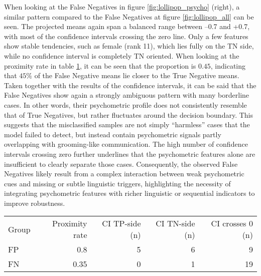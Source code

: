 When looking at the False Negatives in figure \ref{fig:lollipop_psycho} (right), a similar pattern compared to the False Negatives at figure \ref{fig:lollipop_all} can be seen. The projected means again span a balanced range between –0.7 and +0.7, with most of the confidence intervals crossing the zero line. Only a few features show stable tendencies, such as female  (rank 11), which lies fully on the TN side, while no confidence interval is completely TN oriented. When looking at the proximity rate in table \ref{tab:proximity_key_results_psycho}, it can be seen that the proportion is $0.45$, indicating that $45\%$ of the False Negative means lie closer to the True Negative means. Taken together with the results of the confidence intervals, it can be said that the False Negatives show again a strongly ambiguous pattern with many borderline cases.  In other words, their psychometric profile does not consistently resemble that of True Negatives, but rather fluctuates around the decision boundary. This suggests that the misclassified samples are not simply ``harmless'' cases that the model failed to detect, but instead contain psychometric signals partly overlapping with grooming-like communication. The high number of confidence intervals crossing zero further underlines that the psychometric features alone are insufficient to clearly separate those cases. Consequently, the observed False Negatives likely result from a complex interaction between weak psychometric cues and missing or subtle linguistic triggers, highlighting the necessity of integrating psychometric features with richer linguistic or sequential indicators to improve robustness.  


\begin{table}[H]
\centering
{}
\label{tab:proximity_key_results_psycho}
\begin{tabular}{@{}lrrrr@{}}
\toprule
Group & Proximity rate & CI TP-side (n) & CI TN-side (n) & CI crosses 0 (n) \\
\cmidrule(lr){2-5}
FP & 0.8 & 5 & 6 & 9 \\
FN & 0.35 & 0 & 1 & 19 \\
\bottomrule
\end{tabular}
\end{table}









